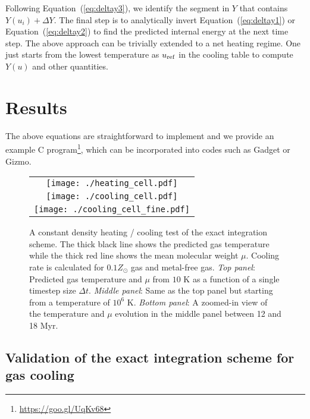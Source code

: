 \documentclass[a4paper,fleqn,usenatbib,useAMS, twocolumn]{mnras}
\begin{document}
Following Equation~(\ref{eq:deltay3}), we identify the segment in $Y$ that contains  
$Y(u_i)+\Delta Y$. The final step is to  analytically invert Equation~(\ref{eq:deltay1}) or
Equation~(\ref{eq:deltay2}) to find the predicted internal energy 
at the next time step. The above approach can be trivially extended to a net heating regime. 
One just starts from the lowest temperature as $u_{\rm ref}$ in the cooling table to compute 
$Y(u)$ and other quantities. 



\section{Results}

The above equations are straightforward to implement and we provide an example C 
program\footnote{\url{https://goo.gl/UqKv68}}, which can be incorporated into codes 
such as {\sc Gadget} or {\sc Gizmo}. 

\label{sec:results} 

\begin{figure}
\begin{center}
\begin{tabular}{c}
\vspace{-0.2cm}
\texttt{[image: ./heating\_cell.pdf]}\\
\vspace{-0.2cm}
\texttt{[image: ./cooling\_cell.pdf]}\\
\vspace{-0.2cm}
\texttt{[image: ./cooling\_cell\_fine.pdf]}\\
\end{tabular}
\caption{\label{fig:cooling_cell} 
A constant density heating / cooling test of the exact integration scheme. 
The thick black line shows the predicted gas temperature while the thick red 
line shows the mean molecular weight $\mu$. Cooling rate is calculated for 
$0.1Z_{\odot}$ gas and metal-free gas. 
\textit{Top panel}: Predicted gas temperature and $\mu$ from $10$ K as a function of a 
single timestep size $\Delta t$. 
\textit{Middle panel}: Same as the top panel but starting from a temperature of $10^6$ K. 
\textit{Bottom panel}: A zoomed-in view of the temperature and $\mu$ evolution in the middle panel 
between 12 and 18 Myr.}
\end{center}
\end{figure}

\subsection{Validation of the exact integration scheme for gas cooling}
\end{document}

